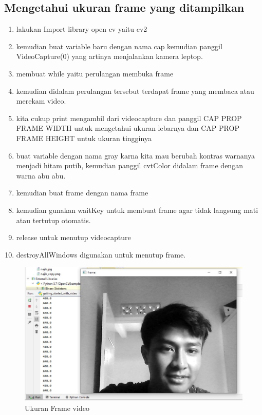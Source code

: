 \newpage
\subsection{Mengetahui ukuran frame yang ditampilkan}

\begin{enumerate}
	\item lakukan Import library open cv yaitu cv2
	\item kemudian buat variable baru dengan nama cap kemudian panggil VideoCapture(0) yang artinya menjalankan kamera leptop.
	\item membuat while yaitu perulangan membuka frame
	\item kemudian didalam perulangan tersebut terdapat frame yang membaca atau merekam video.
	\item kita cukup print mengambil dari videocapture dan panggil CAP PROP FRAME WIDTH untuk mengetahui ukuran lebarnya dan CAP PROP FRAME HEIGHT untuk ukuran tingginya 
	\item buat variable dengan nama gray karna kita mau berubah kontras warnanya menjadi hitam putih, kemudian panggil cvtColor didalam frame dengan warna abu abu.
	\item kemudian buat frame dengan nama frame
	\item kemudian gunakan waitKey untuk membuat frame agar tidak langsung mati atau tertutup otomatis.
	\item release untuk menutup videocapture
	\item destroyAllWindows digunakan untuk menutup frame.
\end{enumerate}

\newpage
\begin{figure}[ht]
\centering
\includegraphics[scale=0.52]{figures/2,6.jpg}
\caption{Ukuran Frame video}
\label{contoh}
\end{figure}


